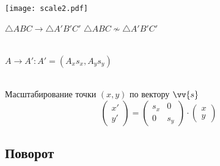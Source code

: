 \documentclass[10pt]{beamer}
\begin{document}
    {
    	{
    		\centering
    		\texttt{[image: scale2.pdf]}
    		
    		
    	}
    	{
    		$\triangle ABC \rightarrow \triangle A'B'C' $ 
    		$\triangle ABC \nsim \triangle A'B'C' $ \\ ~ \\
    		
    		\pause
    		
    		$A \rightarrow A' : A'=(A_xs_x, A_ys_y) $ \\ ~ \\
    		
    		\pause
    		
    		\begin{block}{Масштабирование точки $(x,y)$ по вектору $\vv{s}$ }
    			 $$  
    			\begin{pmatrix}
    				x' \\ y'
    			\end{pmatrix}   
    			=    		
    			\begin{pmatrix}
    				s_x & 0 \\
    				0   & s_y  
    			\end{pmatrix} 
    			\cdot     
    			\begin{pmatrix}
    				x \\ y
    			\end{pmatrix} 		   
    			$$
    		\end{block}    		
    		
    		
    	}
    	
    }
    
    
    \subsection{Поворот}
    
\end{document}
